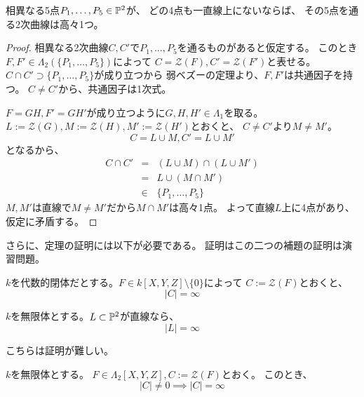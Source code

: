 \documentclass[a4paper]{jsarticle}
\begin{document}
        \begin{Lemma} \label{lemma401:1}
            相異なる5点$P_1, \dots, P_5 \in \mathbb{P}^2$が、
            どの4点も一直線上にないならば、
            その5点を通る2次曲線は高々1つ。
        \end{Lemma}
        \begin{proof}
            相異なる2次曲線$C, C'$で$P_1, \dots, P_5$を通るものがあると仮定する。
            このとき$F, F' \in \Lambda_2(\{P_1, \dots, P_5\})$によって
            $C=\mathcal{Z}(F), C'=\mathcal{Z}(F')$と表せる。
            $C \cap C' \supset \{P_1, \dots, P_5\}$が成り立つから
            弱ベズーの定理より、$F,F'$は共通因子を持つ。
            $C \neq C'$から、共通因子は1次式。

            $F=GH, F'=GH'$が成り立つように$G,H,H' \in \Lambda_1$を取る。
            $L:=\mathcal{Z}(G), M:=\mathcal{Z}(H), M':=\mathcal{Z}(H')$とおくと、
            $C\neq C'$より$M \neq M'$。
            \[ C=L \cup M, C'=L \cup M' \]
            となるから、
            \begin{eqnarray*}
                C \cap C'
                &=&(L \cup M) \cap (L \cup M') \\ 
                &=& L \cup (M \cap M') \\
                &\in& \{P_1, \dots, P_5\}
            \end{eqnarray*}
            $M, M'$は直線で$M \neq M'$だから$M \cap M'$は高々1点。
            よって直線$L$上に4点があり、仮定に矛盾する。
        \end{proof}

        さらに、定理の証明には以下が必要である。
        証明はこの二つの補題の証明は演習問題。
        \begin{Lemma}
            $k$を代数的閉体だとする。$F \in k[X,Y,Z] \setminus \{0\}$によって
            $C:=\mathcal{Z}(F)$とおくと、
            \[ |C|=\infty \]
        \end{Lemma}

        \begin{Lemma}
            $k$を無限体とする。$L \subset \mathbb{P}^2$が直線なら、
            \[ |L|=\infty \]
        \end{Lemma}

        こちらは証明が難しい。
        \begin{Prop}
            $k$を無限体とする。
            $F \in \Lambda_2[X,Y,Z], C:=\mathcal{Z}(F)$とおく。
            このとき、
            \[ |C| \neq 0 \implies |C|=\infty \]
        \end{Prop}
\end{document}
